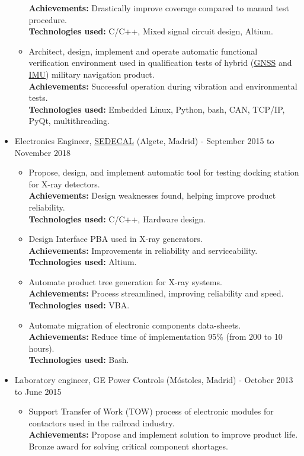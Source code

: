 \documentclass[11pt]{article}
\begin{document}
\begin{itemize}
\begin{itemize}
\textbf{Achievements:} Drastically improve coverage compared to manual test procedure.\\
\textbf{Technologies used:} C/C++, Mixed signal circuit design, Altium.\\
\item Architect, design, implement and operate automatic functional verification environment used in qualification tests of hybrid (\href{https://www.gps.gov/systems/gnss/}{GNSS} and \href{https://en.wikipedia.org/wiki/Inertial\_measurement\_unit}{IMU}) military navigation product.\\
\textbf{Achievements:} Successful operation during vibration and environmental tests.\\
\textbf{Technologies used:} Embedded Linux, Python, bash, CAN, TCP/IP, PyQt, multithreading.\\
\end{itemize}
\item Electronics Engineer, \href{https://www.sedecal.com/en/}{SEDECAL} (Algete, Madrid) - September 2015 to November 2018\\
\begin{itemize}
\item Propose, design, and implement automatic tool for testing docking station for X-ray detectors.\\
\textbf{Achievements:} Design weaknesses found, helping improve product reliability.\\
\textbf{Technologies used:} C/C++, Hardware design.\\
\item Design Interface PBA used in X-ray generators.\\
\textbf{Achievements:} Improvements in reliability and serviceability.\\
\textbf{Technologies used:} Altium.\\
\item Automate product tree generation for X-ray systems.\\
\textbf{Achievements:} Process streamlined, improving reliability and speed.\\
\textbf{Technologies used:} VBA.\\
\item Automate migration of electronic components data-sheets.\\
\textbf{Achievements:} Reduce time of implementation 95\% (from 200 to 10 hours).\\
\textbf{Technologies used:} Bash.\\
\end{itemize}
\item Laboratory engineer, GE Power Controls (Móstoles, Madrid) - October 2013 to June 2015\\
\begin{itemize}
\item Support Transfer of Work (TOW) process of electronic modules for contactors used in the railroad industry.\\
\textbf{Achievements:} Propose and implement solution to improve product life. Bronze award for solving critical component shortages.\\
\end{itemize}
\end{itemize}
\end{document}

